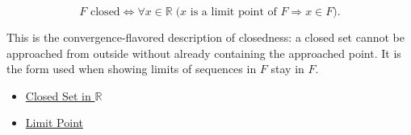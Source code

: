\begin{remark*}
\[
F \text{ closed} \Longleftrightarrow \forall x\in\mathbb{R}\;\bigl(x \text{ is a limit point of } F \Longrightarrow x\in F\bigr).
\]
\end{remark*}
\begin{remark*}[Interpretation]
This is the convergence-flavored description of closedness: a closed set cannot be approached from outside without already containing the approached point. It is the form used when showing limits of sequences in $F$ stay in $F$.
\end{remark*}
\begin{dependencies}
\begin{itemize}
  \item \hyperref[def:closed-set]{Closed Set in $\mathbb{R}$}
  \item \hyperref[def:limit-point]{Limit Point}
\end{itemize}
\end{dependencies}

